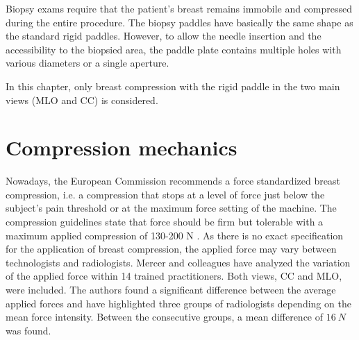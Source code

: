 Biopsy exams require that the patient's breast remains immobile and compressed during the entire procedure. The biopsy paddles have basically the same shape as the standard rigid paddles. However, to allow the needle insertion and the accessibility to the biopsied area, the paddle plate contains multiple holes with various diameters or a single aperture. 

In this chapter, only breast compression with the rigid paddle in the two main views (MLO and CC) is considered.

\section{Compression mechanics} \label{subsec:compressionmechanics}
Nowadays, the European Commission recommends a force standardized breast compression, i.e. a compression that stops at a level of force just below the subject's pain threshold or at the maximum force setting of the machine.  The compression guidelines state that force should be firm but tolerable with a maximum applied compression of 130-200 N \citep{perry_european_2008}. As there is no exact specification for the application of breast compression, the applied force may vary between technologists and radiologists. Mercer and colleagues \citep{mercer_practitioner_2013} have analyzed the variation of the applied force within 14 trained practitioners. Both views, CC and MLO, were included. The authors found a significant difference between the average applied forces and have highlighted three groups of radiologists depending on the mean force intensity. Between the consecutive groups, a mean difference of $16 \ N$ was found. 

